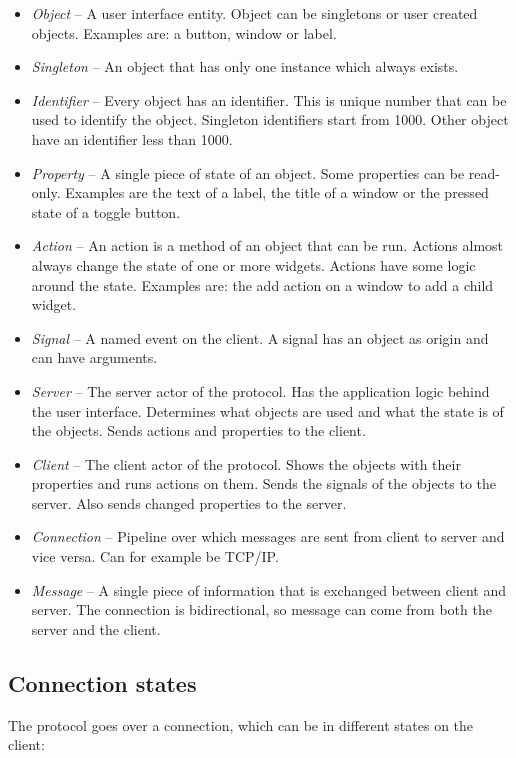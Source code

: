 \documentclass[11pt]{article}
\begin{document}
\begin{itemize}
\item \textit{Object} -- A user interface entity. Object can be singletons or user created objects. Examples are: a button, window or label.
\item \textit{Singleton} -- An object that has only one instance which always exists.
\item \textit{Identifier} -- Every object has an identifier.
This is unique number that can be used to identify the object.
Singleton identifiers start from 1000.
Other object have an identifier less than 1000.
\item \textit{Property} -- A single piece of state of an object. Some properties can be read-only.
Examples are the text of a label, the title of a window or the pressed state of a toggle button.
\item \textit{Action} -- An action is a method of an object that can be run.
Actions almost always change the state of one or more widgets.
Actions have some logic around the state.
Examples are: the add action on a window to add a child widget.
\item \textit{Signal} -- A named event on the client.
A signal has an object as origin and can have arguments.
\item \textit{Server} -- The server actor of the protocol.
Has the application logic behind the user interface.
Determines what objects are used and what the state is of the objects.
Sends actions and properties to the client.
\item \textit{Client} -- The client actor of the protocol.
Shows the objects with their properties and runs actions on them.
Sends the signals of the objects to the server.
Also sends changed properties to the server.
\item \textit{Connection} -- Pipeline over which messages are sent from client to server and vice versa.
Can for example be TCP/IP.
\item \textit{Message} -- A single piece of information that is exchanged between client and server.
The connection is bidirectional, so message can come from both the server and the client.
\end{itemize}

\newpage
\subsection{Connection states}

The protocol goes over a connection, which can be in different states on the client:
\end{document}
